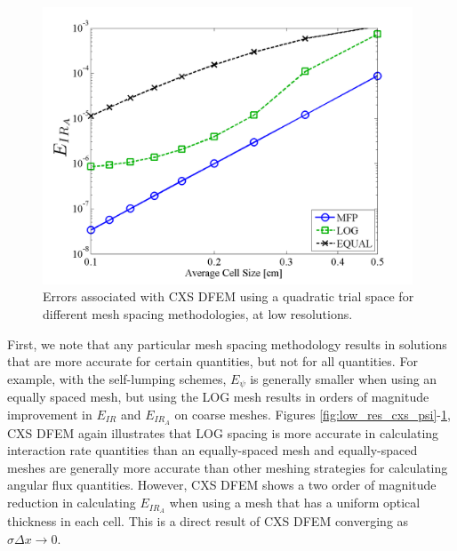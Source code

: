 \begin{figure}[!htp]
\centering
\includegraphics[width=11cm]{chapter3_variable_xs/LOW_RES_P2_CXS_E_IR_A.png}
\caption{Errors associated with CXS DFEM using a quadratic trial space  for different mesh spacing methodologies, at low resolutions.}
\label{fig:low_res_cxs_ir_A}
\end{figure}
First, we note that any particular mesh spacing methodology results in solutions that are more accurate for certain quantities, but not for all quantities.  
For example, with the self-lumping schemes, $E_{\psi}$ is generally smaller when using an equally spaced mesh, but using the LOG mesh results in orders of magnitude improvement in $E_{IR}$ and $E_{IR_A}$ on coarse meshes.
Figures \ref{fig:low_res_cxs_psi}-\ref{fig:low_res_cxs_ir_A}, CXS DFEM again illustrates that LOG spacing is more accurate in calculating interaction rate quantities than an equally-spaced mesh and equally-spaced meshes are generally more accurate than other meshing strategies for calculating angular flux quantities.
However, CXS DFEM shows a two order of magnitude reduction in calculating $E_{IR_A}$ when using a mesh that has a uniform optical thickness in each cell.  This is a direct result of CXS DFEM converging as $\hat{\sigma} \Delta x \to 0$.
\vfill{}

%
%

